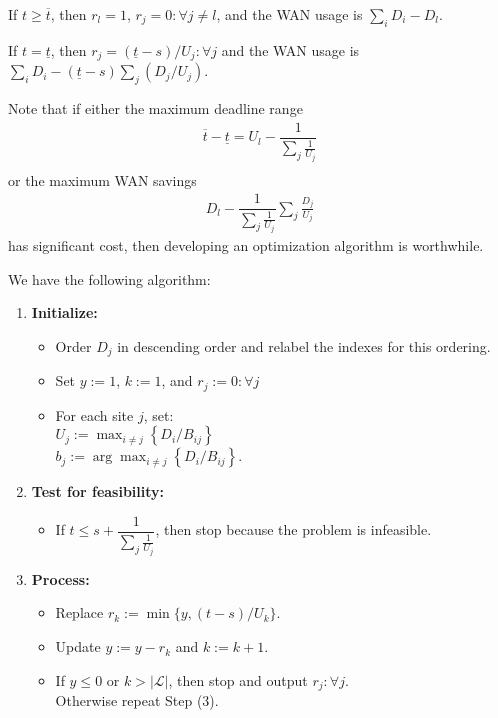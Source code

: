 If $t\geq \overline{t}$, then $r_l=1$, $r_j=0:\forall j\neq l$, and the WAN usage is $\sum_{i}D_i-D_l$.

If $t= \underline{t}$, then $r_j = (\underline{t}-s)/U_j:\forall j$ and the WAN usage is $\sum_{i}D_i-(\underline{t}-s)\sum_{j}(D_j/U_j)$.

Note that if either the maximum deadline range
\begin{align}
	\overline{t}-\underline{t} = U_l - \dfrac{1}{\sum_{j}\frac{1}{U_j}} \\
\end{align}
or the maximum WAN savings
\begin{align}
	D_l-\dfrac{1}{\sum_{j}\frac{1}{U_j}}\sum_{j}\frac{D_j}{U_j}
\end{align}
has significant cost, then developing an optimization algorithm is worthwhile.

We have the following algorithm:
\begin{enumerate}
	\item \textbf{Initialize:}
	\begin{itemize}
		\item Order $D_j$ in descending order and relabel the indexes for this ordering.
		\item Set $y := 1$, $k := 1$, and $r_j := 0:\forall j$
		\item For each site $j$, set:\\
		$U_j := \max_{i\neq j}\left\{D_i/B_{ij}\right\}$\\
		$b_j := \arg\max_{i\neq j}\left\{D_i/B_{ij}\right\}$.
	\end{itemize}
	\item \textbf{Test for feasibility:}
	\begin{itemize}
		\item If $t\leq s+\dfrac{1}{\sum_{j}\frac{1}{U_j}}$, then stop because the problem is infeasible.
	\end{itemize}
	\item \textbf{Process:}
	\begin{itemize}
		\item Replace $r_k := \min\{y,(t-s)/U_k\}$.
		\item Update $y:= y - r_k$ and $k:=k+1$.
		\item If $y \leq 0$ or $k>|\mathcal{L}|$, then stop and output $r_j:\forall j$.\\
		Otherwise repeat Step (3).
	\end{itemize}
\end{enumerate}